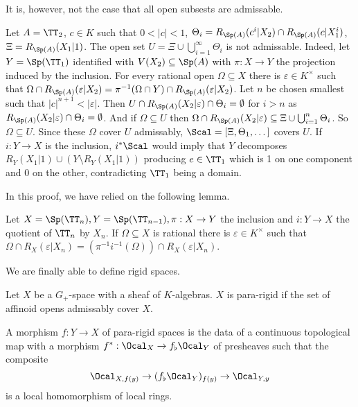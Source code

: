 It is, however, not the case that all open subsests are admissable. 
\begin{example}
    Let $A=\TT_{2}$, $c\in K$ such that $0<|c|<1$, $\Theta_{i}=R_{\Sp(A)}(c^{i}|X_{2})\cap R_{\Sp(A)}(c|X_{1}^{i})$, $\Xi=R_{\Sp(A)}(X_{1}|1)$. The open set $U=\Xi\cup\bigcup_{i=1}^{\infty}\Theta_{i}$ is not admissable. Indeed, let $Y=\Sp(\TT_{1})$ identified with $V(X_{2})\subseteq\Sp(A)$ with $\pi:X\to Y$ the projection induced by the inclusion. For every rational open $\Omega\subseteq X$ there is $\varepsilon\in K^{\times}$ such that $\Omega\cap R_{\Sp(A)}(\varepsilon|X_{2})=\pi^{-1}(\Omega\cap Y)\cap R_{\Sp(A)}(\varepsilon|X_{2})$. Let $n$ be chosen smallest such that $|c|^{n+1}<|\varepsilon|$. Then $U\cap R_{\Sp(A)}(X_{2}|\varepsilon)\cap\Theta_{i}=\emptyset$ for $i>n$ as $R_{\Sp(A)}(X_{2}|\varepsilon)\cap\Theta_{i}=\emptyset$. And if $\Omega\subseteq U$ then $\Omega\cap R_{\Sp(A)}(X_{2}|\varepsilon)\subseteq\Xi\cup\bigcup_{i=1}^{n}\Theta_{i}$. So $\Omega\subseteq U$. Since these $\Omega$ cover $U$ admissably, $\Scal=[\Xi,\Theta_{1},\dots]$ covers $U$. If $i:Y\to X$ is the inclusion, $i^{*}\Scal$ would imply that $Y$ decomposes $R_{Y}(X_{1}|1)\cup(Y\setminus R_{Y}(X_{1}|1))$ producing $e\in \TT_{1}$ which is 1 on one component and 0 on the other, contradicting $\TT_{1}$ being a domain. 
\end{example}
In this proof, we have relied on the following lemma. 
\begin{lemma}
    Let $X=\Sp(\TT_{n}),Y=\Sp(\TT_{n-1}), \pi:X\to Y$ the inclusion and $i:Y\to X$ the quotient of $\TT_{n}$ by $X_{n}$. If $\Omega\subseteq X$ is rational there is $\varepsilon\in K^{\times}$ such that $\Omega\cap R_{X}(\varepsilon|X_{n})=(\pi^{-1}i^{-1}(\Omega))\cap R_{X}(\varepsilon|X_{n})$. 
\end{lemma}
We are finally able to define rigid spaces. 
\begin{definition}\label{def: para-rigid space}
    Let $X$ be a $G_{+}$-space with a sheaf of $K$-algebras. $X$ is para-rigid if the set of affinoid opens admissably cover $X$. 
\end{definition}
\begin{definition}\label{def: morphism of pararigid spaces}
    A morphism $f:Y\to X$ of para-rigid spaces is the data of a continuous topological map with a morphism $f^{*}:\Ocal_{X}\to f_{\flat}\Ocal_{Y}$ of presheaves such that the composite 
    $$\Ocal_{X,f(y)}\to(f_{\flat}\Ocal_{Y})_{f(y)}\to\Ocal_{Y,y}$$
    is a local homomorphism of local rings. 
\end{definition}
